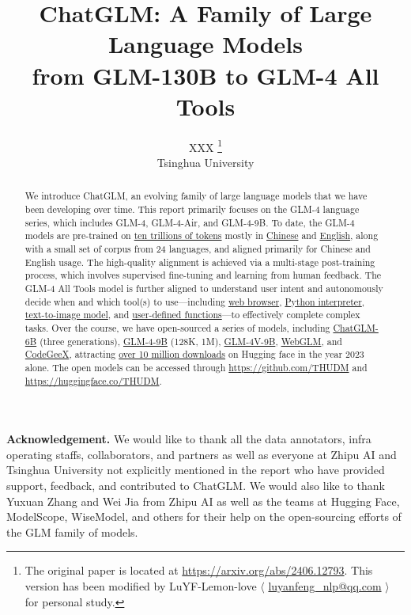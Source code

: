 \documentclass{article}
\title{ChatGLM: A Family of Large Language Models \\from GLM-130B to GLM-4 All Tools}
\author{
    XXX \thanks{The original paper is located at \url{https://arxiv.org/abs/2406.12793}. This version has been modified by LuYF-Lemon-love $\langle$ \url{luyanfeng_nlp@qq.com} $\rangle$ for personal study.}\\
    Tsinghua University
}
\newcommand{\vpara}[1]{\vspace{0.07in}\noindent\textbf{#1}\xspace} %
\begin{document}
\maketitle

\begin{abstract}

We introduce ChatGLM, an evolving family of large language models that we have been developing over time. 
This report primarily focuses on the GLM-4 language series, which includes GLM-4, GLM-4-Air, and GLM-4-9B. 
To date, the GLM-4 models are pre-trained on \uline{ten trillions of tokens} mostly in \uline{Chinese} and \uline{English}, along with a small set of corpus from 24 languages, and aligned primarily for Chinese and English usage. 
The high-quality alignment is achieved via a multi-stage post-training process, which involves supervised fine-tuning and learning from human feedback. 
The GLM-4 All Tools model is further aligned to understand user intent and autonomously decide when and which tool(s) to use---including \uline{web browser}, \uline{Python interpreter}, \uline{text-to-image model}, and \uline{user-defined functions}---to effectively complete complex tasks.
Over the course, we have open-sourced a series of models, including \uline{ChatGLM-6B} (three generations), \uline{GLM-4-9B} (128K, 1M), \uline{GLM-4V-9B}, \uline{WebGLM}, and \uline{CodeGeeX}, attracting \uline{over 10 million downloads} on Hugging face in the year 2023 alone. 
The open models can be accessed through \url{https://github.com/THUDM} and \url{https://huggingface.co/THUDM}. 

\end{abstract}
\clearpage







\vpara{Acknowledgement.} 
We would like to thank all the data annotators, infra operating staffs, collaborators, and partners as well as everyone at Zhipu AI and Tsinghua University not explicitly mentioned in the report who have provided support, feedback, and contributed to ChatGLM. 
We would also like to thank Yuxuan Zhang and Wei Jia from Zhipu AI as well as the teams at Hugging Face, ModelScope, WiseModel, and others for their help on the open-sourcing efforts of the GLM family of models.



\end{document}
